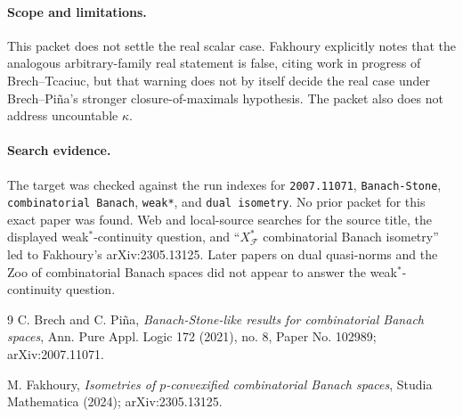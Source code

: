 \documentclass[11pt]{article}
\newcommand{\F}{\mathcal F}
\begin{document}
\paragraph{Scope and limitations.}
This packet does not settle the real scalar case.  Fakhoury explicitly notes
that the analogous arbitrary-family real statement is false, citing work in
progress of Brech--Tcaciuc, but that warning does not by itself decide the
real case under Brech--Pi\~na's stronger closure-of-maximals hypothesis.  The
packet also does not address uncountable $\kappa$.

\paragraph{Search evidence.}
The target was checked against the run indexes for \texttt{2007.11071},
\texttt{Banach-Stone}, \texttt{combinatorial Banach}, \texttt{weak*}, and
\texttt{dual isometry}.  No prior packet for this exact paper was found.
Web and local-source searches for the source title, the displayed
weak$^*$-continuity question, and ``$X_\F^*$ combinatorial Banach isometry''
led to Fakhoury's arXiv:2305.13125.  Later papers on dual quasi-norms and
the Zoo of combinatorial Banach spaces did not appear to answer the
weak$^*$-continuity question.

\begin{thebibliography}{9}
C. Brech and C. Pi\~na,
\emph{Banach-Stone-like results for combinatorial Banach spaces},
Ann. Pure Appl. Logic 172 (2021), no. 8, Paper No. 102989;
arXiv:2007.11071.

M. Fakhoury,
\emph{Isometries of $p$-convexified combinatorial Banach spaces},
Studia Mathematica (2024);
arXiv:2305.13125.
\end{thebibliography}
\end{document}
